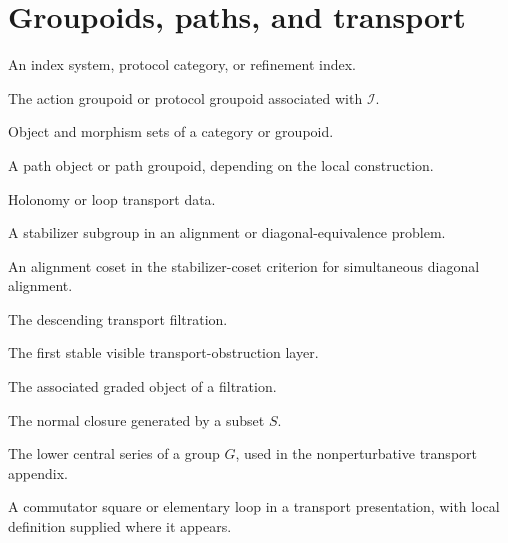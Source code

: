 \section*{Groupoids, paths, and transport}
\begin{description}[leftmargin=3.6cm,style=nextline]
\item[\(\mathcal I\)]
An index system, protocol category, or refinement index.
\item[\(\mathcal G(\mathcal I)\), \(\GI\)]
The action groupoid or protocol groupoid associated with \(\mathcal I\).
\item[\(\Ob\), \(\Mor\)]
Object and morphism sets of a category or groupoid.
\item[\(\Path\)]
A path object or path groupoid, depending on the local construction.
\item[\(\Hol\)]
Holonomy or loop transport data.
\item[\(H_k=\Stab(x_k)\)]
A stabilizer subgroup in an alignment or diagonal-equivalence problem.
\item[\(C_k\)]
An alignment coset in the stabilizer-coset criterion for simultaneous
diagonal alignment.
\item[\(F^k\)]
The descending transport filtration.
\item[\(F^2/F^3\)]
The first stable visible transport-obstruction layer.
\item[\(\gr\)]
The associated graded object of a filtration.
\item[\(\ncl{S}\)]
The normal closure generated by a subset \(S\).
\item[\(\gamma_i(G)\)]
The lower central series of a group \(G\), used in the nonperturbative
transport appendix.
\item[\(\square_{ij}\)]
A commutator square or elementary loop in a transport presentation,
with local definition supplied where it appears.
\end{description}

